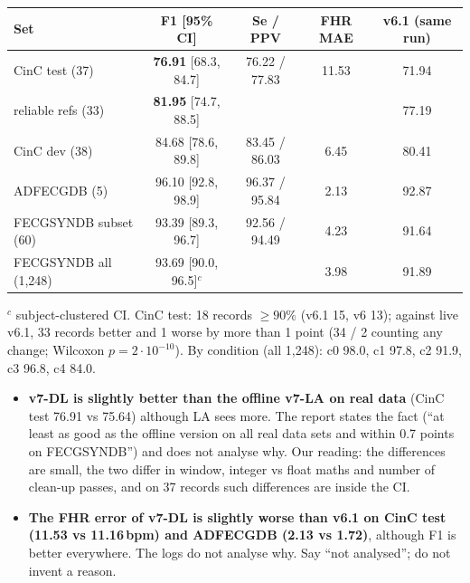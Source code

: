 \documentclass[11pt]{article}
\begin{document}
\begin{keyfact}
\begin{tabular}{@{}lcccc@{}}
\toprule
Set & F1 [95\% CI] & Se / PPV & FHR MAE & v6.1 (same run) \\
\midrule
CinC test (37) & \textbf{76.91} [68.3, 84.7] & 76.22 / 77.83 & 11.53 & 71.94 \\
\quad reliable refs (33) & \textbf{81.95} [74.7, 88.5] & & & 77.19 \\
CinC dev (38) & 84.68 [78.6, 89.8] & 83.45 / 86.03 & 6.45 & 80.41 \\
ADFECGDB (5) & 96.10 [92.8, 98.9] & 96.37 / 95.84 & 2.13 & 92.87 \\
FECGSYNDB subset (60) & 93.39 [89.3, 96.7] & 92.56 / 94.49 & 4.23 & 91.64 \\
FECGSYNDB all (1,248) & 93.69 [90.0, 96.5]$^c$ & & 3.98 & 91.89 \\
\bottomrule
\end{tabular}\par
$^c$ subject-clustered CI. CinC test: 18 records $\ge 90\%$ (v6.1 15, v6 13); against live v6.1, 33 records better and 1 worse by more than 1 point (34 / 2 counting any change; Wilcoxon $p = 2\cdot10^{-10}$). By condition (all 1,248): c0 98.0, c1 97.8, c2 91.9, c3 96.8, c4 84.0.
\end{keyfact}

\begin{warn}
\begin{itemize}
  \item \textbf{v7-DL is slightly better than the offline v7-LA on real data} (CinC test 76.91 vs 75.64) although LA sees more. The report states the fact (``at least as good as the offline version on all real data sets and within 0.7 points on FECGSYNDB'') and does not analyse why. Our reading: the differences are small, the two differ in window, integer vs float maths and number of clean-up passes, and on 37 records such differences are inside the CI.
  \item \textbf{The FHR error of v7-DL is slightly worse than v6.1 on CinC test (11.53 vs 11.16\,bpm) and ADFECGDB (2.13 vs 1.72)}, although F1 is better everywhere. The logs do not analyse why. Say ``not analysed''; do not invent a reason.
\end{itemize}
\end{warn}
\end{document}
